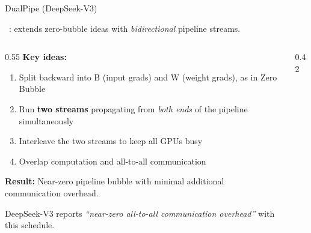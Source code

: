 \begin{frame}{DualPipe (DeepSeek-V3)}

  ~\cite{deepseekai2024deepseekv3}: extends zero-bubble ideas with \emph{bidirectional} pipeline streams.

  \vspace{0.3em}
  \begin{columns}
    \begin{column}{0.55\textwidth}
      \textbf{Key ideas:}
      \begin{enumerate}
        \item Split backward into B (input grads) and W (weight grads), as in Zero Bubble
        \item Run \textbf{two streams} propagating from \emph{both ends} of the pipeline simultaneously
        \item Interleave the two streams to keep all GPUs busy
        \item Overlap computation and all-to-all communication
      \end{enumerate}

      \vspace{0.3em}
      \textbf{Result:} Near-zero pipeline bubble with minimal additional communication overhead.

      \vspace{0.3em}
      DeepSeek-V3 reports \emph{``near-zero all-to-all communication overhead''} with this schedule.
    \end{column}
    \begin{column}{0.42\textwidth}
\end{column}
\end{columns}
\end{frame}

